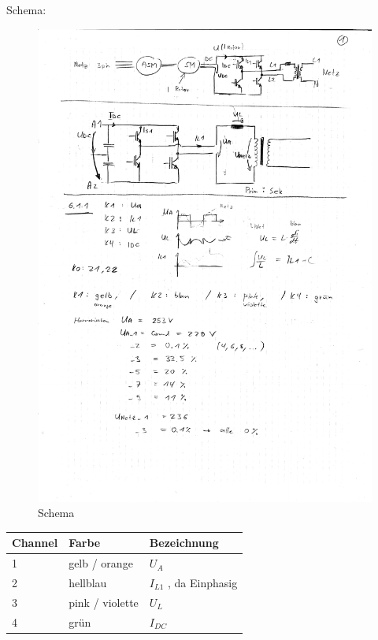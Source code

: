 
\noindent Schema:

\begin{figure}[ht]
  \begin{center}
  \includegraphics[width=1\textwidth, trim={1cm 19.38cm 1cm 5cm},clip]{notes/scan1.pdf}
  \caption{Schema}
  \label{fig:schema}
  \end{center}
\end{figure}



\begin{center}
\begin{tabular}{ l | l | l }
  \hline 
  Channel & Farbe & Bezeichnung \\
  \hline \hline
  1 & gelb / orange &  $U_A$ \\
  \hline
  2 & hellblau & $I_{L1}$ , da Einphasig\\  
  \hline 
  3 & pink / violette & $U_{L}$ \\  
  \hline
  4 & grün & $I_{DC}$ \\  
  \hline
\end{tabular}
\end{center}



\clearpage